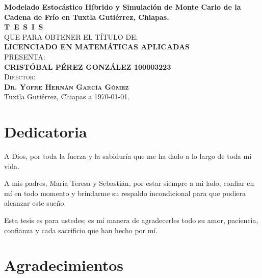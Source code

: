 \documentclass[
  spanish,
  us-letterpaper,
]{scrreprt}
\numberwithin{equation}{section}
\theoremstyle{plain}
\theoremstyle{plain}
\theoremstyle{definition}
\theoremstyle{plain}
\theoremstyle{remark}
\begin{document}
\begin{titlepage}
\begin{minipage}[t][0.95\textheight][c]{0.76\textwidth}
            \begin{center}
                \vspace{0.7cm}
                {\Large\bfseries Modelado Estocástico Híbrido y Simulación de Monte Carlo de la Cadena de Frío en Tuxtla Gutiérrez, Chiapas.}\\[2cm]
                \textsc{\huge \textbf{T\, E\, S\, I\, S}}\\[1.5cm]
                \textsc{\large QUE PARA OBTENER EL TÍTULO DE:}\\[0.3cm]
                \textbf{\textsc{LICENCIADO EN MATEMÁTICAS APLICADAS}}\\[1.5cm]
                \textsc{\large PRESENTA:}\\[0.3cm]
                \textbf{\textsc{\large {CRISTÓBAL PÉREZ GONZÁLEZ 100003223}}}\\[2cm]
                {\large\scshape Director:\\[0.3cm]
                {\textbf{\large Dr. Yofre Hernán García Gómez }}}\\[2.0cm]
                \large{Tuxtla Gutiérrez, Chiapas a \today.}

            \end{center}
\end{minipage}
\end{titlepage}

\pagebreak[2]

\chapter*{Dedicatoria}
\begin{flushright}
\itshape
\setlength{\parindent}{0pt} %
\setlength{\parskip}{1.2\baselineskip} %

A Dios, por toda la fuerza y la sabiduría que me ha dado a lo largo de toda mi vida.

A mis padres, María Teresa y Sebastián, por estar siempre a mi lado, confiar en mí en todo momento y brindarme su respaldo incondicional para que pudiera alcanzar este sueño.

Esta tesis es para ustedes; es mi manera de agradecerles todo su amor, paciencia, confianza y cada sacrificio que han hecho por mí.
\end{flushright}


\chapter*{Agradecimientos}
\end{document}
